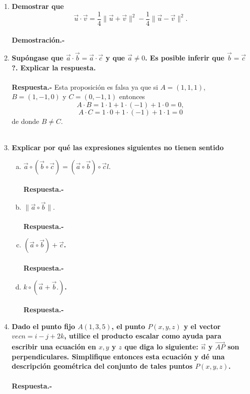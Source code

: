 \begin{enumerate}
\item \textbf{\boldmath Demostrar que 
    $$\vec{u}\cdot \vec{v} = \dfrac{1}{4} \|\vec{u}+\vec{v}\|^2 - \dfrac{1}{4} \|\vec{u}-\vec{v}\|^2.$$\\
    Demostración.-}\;


\item \textbf{\boldmath Supóngase que $\vec{a}\cdot \vec{b} = \vec{a}\cdot \vec{c}$ y que $\vec{a}\neq 0$. Es posible inferir que $\vec{b}=\vec{c}$?. Explicar la respuesta.\\\\
    Respuesta.-}\; Esta proposición es falsa ya que si $A=(1,1,1)$, $B=(1,-1,0)$ y $C=(0,-1,1)$ entonces $$A\cdot B = 1\cdot 1 + 1\cdot(-1)+1\cdot 0 = 0,$$ $$A\cdot C = 1\cdot 0 + 1\cdot(-1)+1\cdot 1 = 0$$
    de donde $B\neq C$.\\\\ 

\item \textbf{\boldmath Explicar por qué las expresiones siguientes no tienen sentido}

    \begin{enumerate}[a)]

	\item \textbf{\boldmath $\vec{a}\circ \left(\vec{b}\circ \vec{c}\right)=\left(\vec{a}\circ \vec{b}\right)\circ \vec{c}l.$\\\\
	    Respuesta.-}\;

	\item \textbf{\boldmath $\|\vec{a}\circ\vec{b}\|.$\\\\
	    Respuesta.-}\;

	\item \textbf{\boldmath $(\vec{a}\circ \vec{b})+\vec{c}$.\\\\
	    Respuesta.-}\; 

	\item \textbf{\boldmath $k\circ \left(\vec{a}+\vec{b}.\right)$.\\\\
	    Respuesta.-}\; 

    \end{enumerate}

\item \textbf{ \boldmath Dado el punto fijo $A(1, 3, 5)$, el punto $P(x, y, z)$ y el vector $vec{n} = i - j + 2k$, utilice el producto escalar como ayuda para escribir una ecuación en $x, y$ y $z$ que diga lo siguiente: $\vec{n}$ y $\vec{AP}$ son perpendiculares. Simplifique entonces esta ecuación y dé una descripción geométrica del conjunto de tales puntos $P(x, y, z)$.\\\\
    Respuesta.-}\;


\end{enumerate}
